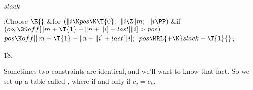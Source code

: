 \Y\B\4\D$\\{slack}$ \5
\par
\Y\B\4:Choose \X${}\E{}$\6
\&{for} ${}(\|i\K\\{pos}\K\T{0};{}$ ${}\|i\Z\|m;{}$ ${}\|i\PP){}$\1\6
\&{if} ${}(\\{oo},\39\\{off}[\|m+\T{1}-\|n+\|i]+\\{last}[\|i]>\\{pos}){}$\1\5
${}\\{pos}\K\\{off}[\|m+\T{1}-\|n+\|i]+\\{last}[\|i];{}$\2\2\6
${}\\{pos}\MRL{+{\K}}\\{slack}-\T{1}{}$;\par
\U18.\fi

Sometimes two constraints are identical,
and we'll want to know that fact.
So we set up a table called , where 
if and only if
$c_j=c_k$.

